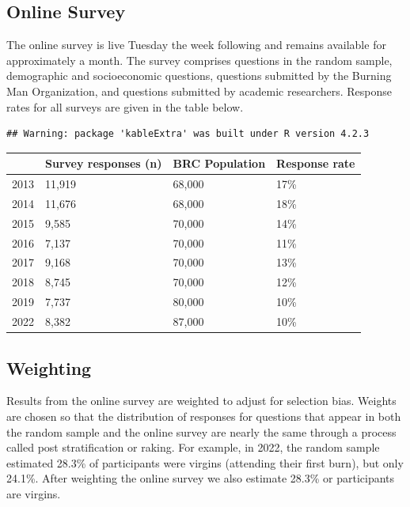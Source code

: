 \documentclass[
]{book}
\begin{document}
\hypertarget{online-survey}{%
\subsection{Online Survey}\label{online-survey}}

The online survey is live Tuesday the week following and remains available
for approximately a month. The survey comprises questions in the random
sample, demographic and socioeconomic questions, questions submitted by
the Burning Man Organization, and questions submitted by academic researchers.
Response rates for all surveys are given in the table below.

\begin{verbatim}
## Warning: package 'kableExtra' was built under R version 4.2.3
\end{verbatim}

\begin{table}
\centering
\begin{tabular}[t]{>{}l|l|l|l}
\hline
  & Survey responses (n) & BRC Population & Response rate\\
\hline
2013 & 11,919 & 68,000 & 17\%\\
\hline
2014 & 11,676 & 68,000 & 18\%\\
\hline
2015 & 9,585 & 70,000 & 14\%\\
\hline
2016 & 7,137 & 70,000 & 11\%\\
\hline
2017 & 9,168 & 70,000 & 13\%\\
\hline
2018 & 8,745 & 70,000 & 12\%\\
\hline
2019 & 7,737 & 80,000 & 10\%\\
\hline
2022 & 8,382 & 87,000 & 10\%\\
\hline
\end{tabular}
\end{table}

\hypertarget{weighting}{%
\subsection{Weighting}\label{weighting}}

Results from the online survey are weighted to adjust for selection bias. Weights
are chosen so that the distribution of responses for questions that appear in
both the random sample and the online survey are nearly the same through a
process called post stratification or raking. For example, in 2022, the random
sample estimated 28.3\% of participants were virgins (attending their first burn),
but only 24.1\%. After weighting the online survey we also estimate 28.3\%
or participants are virgins.
\end{document}
